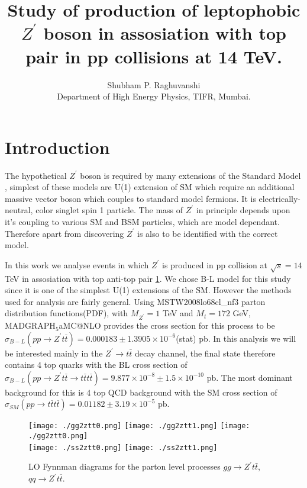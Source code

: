 \documentclass[12pt,a4paper]{article}		%
\title{\textbf { Study of production of leptophobic $Z^\prime$ boson in assosiation with top pair in pp collisions at 14 TeV.} }
\author{Shubham P. Raghuvanshi\\Department of High Energy Physics, TIFR, Mumbai.}
\begin{document}
\maketitle
\thispagestyle{empty}
\newpage
\tableofcontents
\newpage
\thispagestyle{empty}
\listoffigures
\newpage
\section{Introduction}


The hypothetical $Z^\prime$ boson is required by many extensions of the Standard Model \cite{paul,zpdg}, simplest of these models are U(1) extension of SM which require an additional massive vector boson which couples to standard model fermions. It is electrically-neutral, color singlet spin 1 particle. The mass of $Z^\prime$ in principle depends upon it's coupling to various SM and BSM particles, which are model dependant. Therefore apart from discovering $Z^\prime$ is also to be identified with the correct model.

In this work we analyse events in which $Z^\prime$ is produced in pp collision at $\sqrt{s} = 14$ TeV in assosiation with top anti-top pair \ref{fynnmann}. We chose B-L model \cite{bl} for this study since it is one of the simplest U(1) extensions of the SM. However the methods used for analysis are fairly general. Using MSTW2008lo68cl\_nf3 \cite{pdfsets} parton distribution functions(PDF), with $M_{Z^\prime} = 1$ TeV and $M_t = 172$ GeV, $ \text{MADGRAPH}_5$aMC@NLO \cite{mad1,mad2} provides the cross section for this process to be $ \sigma_{B-L}( p p \to Z^\prime t \bar{t}) = 0.000183 \pm 1.3905 \times 10^{-6}$(stat) pb. In this analysis we will be interested mainly in the $Z^\prime \to t \bar{t}$ decay channel, the final state therefore contains 4 top quarks with the BL cross section of $ \sigma_{B-L}(pp \to Z^\prime t \bar{t} \to t \bar{t}t \bar{t}) = 9.877 \times 10^{-8} \pm  1.5 \times 10^{-10}$ pb. The most dominant background for this is 4 top QCD background with the SM cross section of $\sigma_{SM}(pp \to t \bar{t}t \bar{t}) = 0.01182 \pm 3.19 \times 10^{-5}$ pb. 

	\begin{figure}[h] 	 		
		\begin{centering}	
			\texttt{[image: ./gg2ztt0.png]}				\texttt{[image: ./gg2ztt1.png]}
			\texttt{[image: ./gg2ztt0.png]} \\ 			
			\texttt{[image: ./ss2ztt0.png]} 
			\texttt{[image: ./ss2ztt1.png]}
			\caption{ LO Fynnman diagrams for the parton level processes $gg \to Z^\prime t \bar{t}$, $qq \to Z^\prime t \bar{t}$. }
			\label{fynnmann}
			\centering
		\end{centering}
	\end{figure}   
\end{document}
